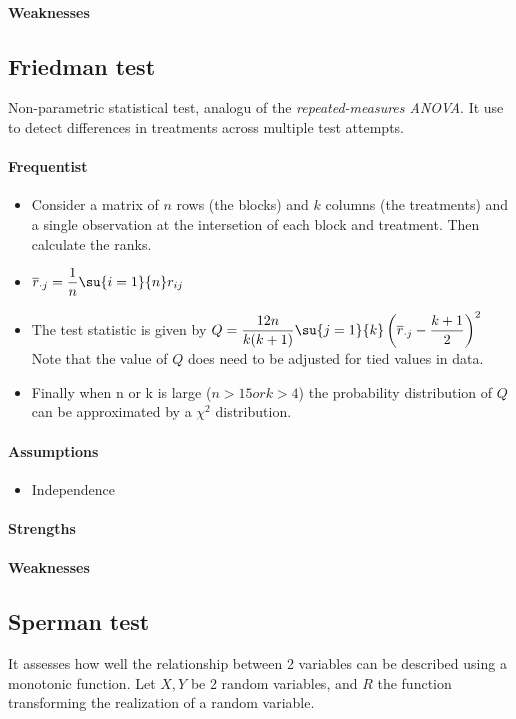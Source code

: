 \paragraph{Weaknesses}

\subsection{Friedman test}
Non-parametric statistical test, analogu of the \emph{repeated-measures ANOVA}.
It use to detect differences in treatments across multiple test attempts.
\paragraph{Frequentist}
\begin{itemize}
    \item Consider a matrix of $n$ rows (the blocks) and $k$ columns (the treatments)
    and a single observation at the intersetion of each block and treatment. Then 
    calculate the ranks.
    \item $\overline{r}_{\cdot j} = \dfrac{1}{n}\su{i=1}{n}r_{ij}$
    \item The test statistic is given by $Q = \dfrac{12n}{k(k+1)}\su{j=1}{k}\left(\overline{r}_{\cdot j} - \dfrac{k+1}{2}\right)^{2}$
    Note that the value of $Q$ does need to be adjusted for tied values in data.
    \item Finally when n or k is large ($n>15 or k>4$) the probability distribution of $Q$ can be approximated by
    a $\chi^{2}$ distribution.
\end{itemize}

\paragraph{Assumptions}
\begin{itemize}
    \item Independence
\end{itemize}
\paragraph{Strengths}
\paragraph{Weaknesses}

\subsection{Sperman test}
It assesses how well the relationship between 2 variables can be described using a monotonic function.
Let $X, Y$ be 2 random variables, and $R$ the function transforming the realization of a random variable.

